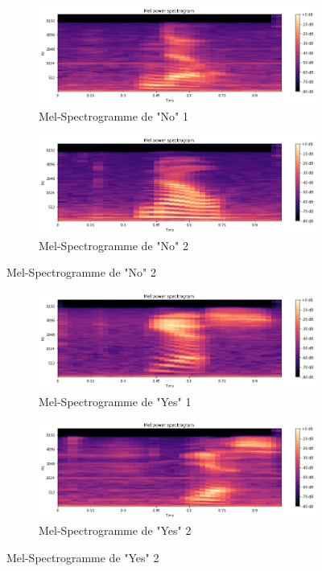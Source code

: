 \documentclass[12 pt, a4paper]{article}
\begin{document}
\begin{figure}[h]
\centering
\begin{subfigure}{0.5\textwidth}
  \centering
  \includegraphics[width=1.0\linewidth]{no1.png}
  \caption{Mel-Spectrogramme de "No" 1}
\end{subfigure}%
\begin{subfigure}{0.5\textwidth}
  \centering
  \includegraphics[width=1.0\linewidth]{no2.png}
  \caption{Mel-Spectrogramme de "No" 2}
\end{subfigure}%
\end{figure}

\begin{figure}[h]
\centering
\begin{subfigure}{0.5\textwidth}
  \centering
  \includegraphics[width=1.0\linewidth]{yes1.png}
  \caption{Mel-Spectrogramme de "Yes" 1}
\end{subfigure}%
\begin{subfigure}{0.5\textwidth}
  \centering
  \includegraphics[width=1.0\linewidth]{yes2.png}
  \caption{Mel-Spectrogramme de "Yes" 2}
\end{subfigure}%
\end{figure}
\end{document}
